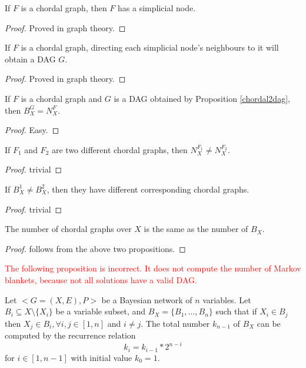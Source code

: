 \iffalse
\begin{proposition}
If $F$ is a chordal graph, then $F$ has a simplicial node. 
\end{proposition}

\begin{proof}
Proved in graph theory.
\end{proof}

\begin{proposition}
\label{chordal2dag}
If $F$ is a chordal graph, directing each simplicial node's neighbours to it will obtain a DAG $G$.
\end{proposition}

\begin{proof}
Proved in graph theory.
\end{proof}

\begin{proposition}
If $F$ is a chordal graph and $G$ is a DAG obtained by Proposition \ref{chordal2dag}, then $B_X^G = N_X^F$.
\end{proposition}

\begin{proof}
Easy.
\end{proof}

\begin{proposition}
If $F_1$ and $F_2$ are two different chordal graphs, then $N_X^{F_1} \neq N_X^{F_2}$. 
\end{proposition}

\begin{proof}
trivial
\end{proof}

\begin{proposition}
If $B_X^1 \neq B_X^2$, then they have different corresponding chordal graphs. 
\end{proposition}

\begin{proof}
trivial
\end{proof}


\begin{corollary}
The number of chordal graphs over $X$ is the same as the number of $B_X$. 
\end{corollary}

\begin{proof}
follows from the above two propositions.
\end{proof}


\textcolor{red}{The following proposition is incorrect. It does not compute the number of Markov blankets, because not all solutions have a valid DAG.}
\begin{proposition}
Let $<G=(X,E), P>$ be a Bayesian network of $n$ variables. Let $B_i \subseteq X \setminus \{X_i\}$ be a variable subset, and $B_X = \{B_1, \dots, B_n\}$ such that if $X_i \in B_j$ then $X_j \in B_i, \forall i, j \in [1, n]$ and $i \neq j$. The total number $k_{n-1}$ of $B_X$ can be computed by the recurrence relation
\begin{equation}
k_i = k_{i-1} * 2^{n-i}
\end{equation}
for $i \in [1, n-1]$ with initial value $k_0 = 1$.
\end{proposition}

